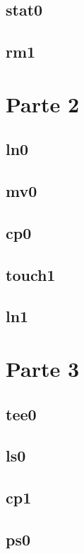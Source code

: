 \documentclass{article}
\begin{document}
\subsection{stat0}


\subsection{rm1}


\newpage

\section{Parte 2}
\subsection{ln0}


\subsection{mv0}


\subsection{cp0}


\subsection{touch1}


\subsection{ln1}


\newpage

\section{Parte 3}
\subsection{tee0}


\subsection{ls0}


\subsection{cp1}


\subsection{ps0}

\end{document}
